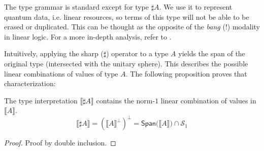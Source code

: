 \documentclass[runningheads,orivec]{llncs}
\providecommand{\qed}{\hbox{\rule{1ex}{1ex}}}%
\newcommand{\qedhere}{%
  \ifmmode
    \tag*{\qed}%
  \else
    \hfill\qed%
  \fi
}
\newcommand\Span[1]{\ensuremath{{\mathsf{Span}}{#1}}}
\def\Sph{\mathcal{S}_1}       %
\def\scal#1#2{\langle{#1}~|~{#2}\rangle}
\def\sem#1{\llbracket#1\rrbracket}
\begin{document}
The type grammar is standard except for type $\sharp A$. We use it to represent quantum data, i.e. linear resources, so terms of this type will not be able to be erased or duplicated. This can be thought as the opposite of the \textit{bang} ($!$) modality in linear logic. For a more in-depth analysis, refer to \cite{DiazcaroCIE2025}.

Intuitively, applying the sharp ($\sharp$) operator to a type $A$ yields the span of the original type (intersected with the unitary sphere). This describes the possible linear combinations of values of type $A$. The following proposition proves that characterization:

\begin{proposition}\label{prop:SharpCharacterization}
  The type interpretation $\sem{\sharp A}$ contains the norm-$1$ linear combination of values in $\sem{A}$.
  \[
  \sem{\sharp A} = (\sem{A}^\bot)^\bot = \Span(\sem{A})\cap\Sph
  \]
\end{proposition}

\begin{proof}
  Proof by double inclusion.
\end{proof}
\end{document}
